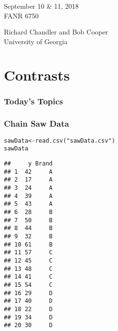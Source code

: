 \documentclass[color=usenames,dvipsnames]{beamer}\usepackage[]{graphicx}\usepackage[]{color}
\makeatletter
\newcommand{\hlstr}[1]{\textcolor[rgb]{0.749,0.012,0.012}{#1}}%
\newcommand{\hlstd}[1]{\textcolor[rgb]{0,0,0}{#1}}%
\newcommand{\hlkwb}[1]{\textcolor[rgb]{0,0.341,0.682}{#1}}%
\newcommand{\hlkwd}[1]{\textcolor[rgb]{0.004,0.004,0.506}{#1}}%
\newenvironment{kframe}{%
 \def\at@end@of@kframe{}%
 \ifinner\ifhmode%
  \def\at@end@of@kframe{\end{minipage}}%
  \begin{minipage}{\columnwidth}%
 \fi\fi%
 \def\FrameCommand##1{\hskip\@totalleftmargin \hskip-\fboxsep
 \colorbox{shadecolor}{##1}\hskip-\fboxsep
     \hskip-\linewidth \hskip-\@totalleftmargin \hskip\columnwidth}%
 \MakeFramed {\advance\hsize-\width
   \@totalleftmargin\z@ \linewidth\hsize
   \@setminipage}}%
 {\par\unskip\endMakeFramed%
 \at@end@of@kframe}
\newenvironment{knitrout}{}{} %
\makeatother
\begin{document}

\begin{frame}[plain]
  \LARGE
  \centering \par
  {\bf \color{RoyalBlue}{Lab 4 -- Contrasts, Estimation, and Power Analysis \par}}
  \vspace{1cm}
  \Large
  September 10 \& 11, 2018 \\
  FANR 6750 \par
  \vfill
  \large
  Richard Chandler and Bob Cooper \\
  University of Georgia \\
\end{frame}





\section{Contrasts}


\begin{frame}[plain]
  \frametitle{Today's Topics}
  \Large
\end{frame}



\begin{frame}[fragile]
  \frametitle{Chain Saw Data}
\begin{knitrout}\scriptsize
{}\color{fgcolor}\begin{kframe}
\begin{alltt}
\hlstd{sawData} \hlkwb{<-} \hlkwd{read.csv}\hlstd{(}\hlstr{"sawData.csv"}\hlstd{)}
\hlstd{sawData}
\end{alltt}
\begin{verbatim}
##     y Brand
## 1  42     A
## 2  17     A
## 3  24     A
## 4  39     A
## 5  43     A
## 6  28     B
## 7  50     B
## 8  44     B
## 9  32     B
## 10 61     B
## 11 57     C
## 12 45     C
## 13 48     C
## 14 41     C
## 15 54     C
## 16 29     D
## 17 40     D
## 18 22     D
## 19 34     D
## 20 30     D
\end{verbatim}
\end{kframe}
\end{knitrout}
\end{frame}
\end{document}
